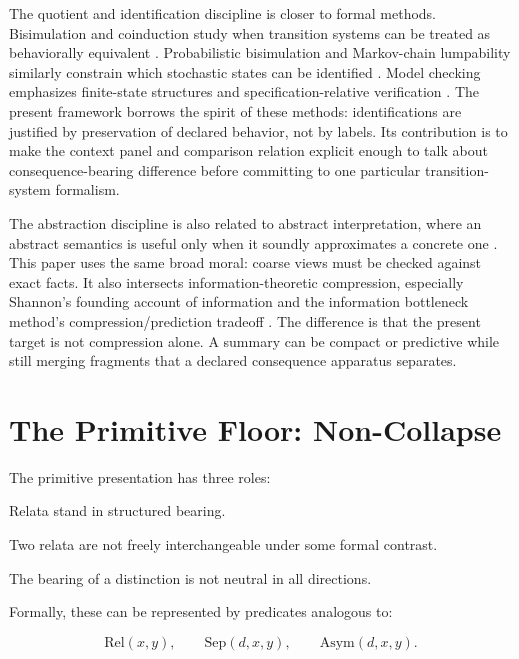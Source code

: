 \documentclass[11pt]{article}
\newcommand{\Rel}{\mathrm{Rel}}
\newcommand{\Sep}{\mathrm{Sep}}
\newcommand{\Asym}{\mathrm{Asym}}
\begin{document}
The quotient and identification discipline is closer to formal methods.
Bisimulation and coinduction study when transition systems can be treated as
behaviorally equivalent \cite{milner1989communication,sangiorgi2012bisimulation}.
Probabilistic bisimulation and Markov-chain lumpability similarly constrain
which stochastic states can be identified
\cite{larsen1991bisimulation,kemeny1960finite}. Model checking emphasizes
finite-state structures and specification-relative verification
\cite{baier2008principles}. The present framework borrows the spirit of these
methods: identifications are justified by preservation of declared behavior,
not by labels. Its contribution is to make the context panel and comparison
relation explicit enough to talk about consequence-bearing difference before
committing to one particular transition-system formalism.

The abstraction discipline is also related to abstract interpretation, where an
abstract semantics is useful only when it soundly approximates a concrete one
\cite{cousot1977abstract}. This paper uses the same broad moral: coarse views
must be checked against exact facts. It also intersects information-theoretic
compression, especially Shannon's founding account of information
\cite{shannon1948mathematical} and the information bottleneck method's
compression/prediction tradeoff \cite{tishby1999information}. The difference is
that the present target is not compression alone. A summary can be compact or
predictive while still merging fragments that a declared consequence apparatus
separates.

\section{The Primitive Floor: Non-Collapse}

The primitive presentation has three roles:

\begin{description}[leftmargin=*]
  \item[Relation] Relata stand in structured bearing.
  \item[Distinction] Two relata are not freely interchangeable under some
  formal contrast.
  \item[Asymmetry] The bearing of a distinction is not neutral in all
  directions.
\end{description}

Formally, these can be represented by predicates analogous to:

\[
\Rel(x,y), \qquad \Sep(d,x,y), \qquad \Asym(d,x,y).
\]
\end{document}
